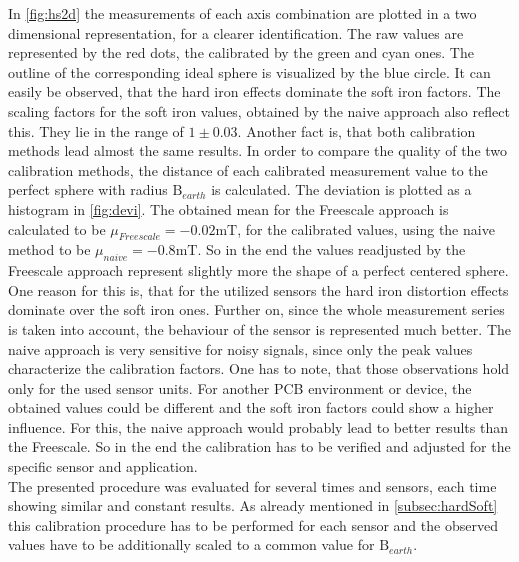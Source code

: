 In \ref{fig:hs2d} the measurements of each axis combination are plotted in a two dimensional representation, for a clearer identification. The raw values are represented by the red dots, the calibrated by the green and cyan ones. The outline of the corresponding ideal sphere is visualized by the blue circle. It can easily be observed, that the hard iron effects dominate the soft iron factors. The scaling factors for the soft iron values, obtained by the naive approach also reflect this. They lie in the range of $ 1 \pm 0.03 $. Another fact is, that both calibration methods lead almost the same results. In order to compare the quality of the two calibration methods, the distance of each calibrated measurement value to the perfect sphere with radius $ \mathrm{B}_{earth} $ is calculated. The deviation is plotted as a histogram in \ref{fig:devi}. The obtained mean for the Freescale approach is calculated to be $ \mu_{Freescale} = -0.02\si{\milli \tesla} $, for the calibrated values, using the naive method to be $ \mu_{naive} = -0.8\si{\milli \tesla} $. So in the end the values readjusted by the Freescale approach represent slightly more the shape of a perfect centered sphere. One reason for this is, that for the utilized sensors the hard iron distortion effects dominate over the soft iron ones. Further on, since the whole measurement series is taken into account, the behaviour of the sensor is represented much better. The naive approach is very sensitive for noisy signals, since only the peak values characterize the calibration factors. One has to note, that those observations hold only for the used sensor units. For another \ac{PCB} environment or device, the obtained values could be different and the soft iron factors could show a higher influence. For this, the naive approach would probably lead to better results than the Freescale. So in the end the calibration has to be verified and adjusted for the specific sensor and application.\\
The presented procedure was evaluated for several times and sensors, each time showing similar and constant results. As already mentioned in \ref{subsec:hardSoft} this calibration procedure has to be performed for each sensor and the observed values have to be additionally scaled to a common value for $ \mathrm{B}_{earth} $.
